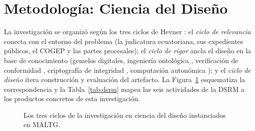 \documentclass[computers,article,submit,pdftex,moreauthors]{Definitions/mdpi}
\begin{document}
\section{Metodología: Ciencia del Diseño}
\label{sec:dsr}

La investigación se organizó según los tres ciclos de Hevner \cite{Hevner2004}: el \emph{ciclo de relevancia} conecta con el entorno del problema (la judicatura ecuatoriana, sus expedientes públicos, el COGEP y las partes procesales); el \emph{ciclo de rigor} ancla el diseño en la base de conocimiento (gemelos digitales, ingeniería ontológica \cite{Gruber1993,Uschold1996,Guarino2002}, verificación de conformidad \cite{Rozinat2008}, criptografía de integridad \cite{Haber1991}, computación autonómica \cite{Kephart2003}); y el \emph{ciclo de diseño} itera construcción y evaluación del artefacto. La Figura~\ref{fig:ciclos} esquematiza la correspondencia y la Tabla~\ref{tab:dsrm} mapea las seis actividades de la DSRM \cite{Peffers2007} a los productos concretos de esta investigación.

\begin{figure}[H]
\centering
{}
\caption{Los tres ciclos de la investigación en ciencia del diseño \cite{Hevner2004} instanciados en MALTG.}
\label{fig:ciclos}
\end{figure}
\end{document}
